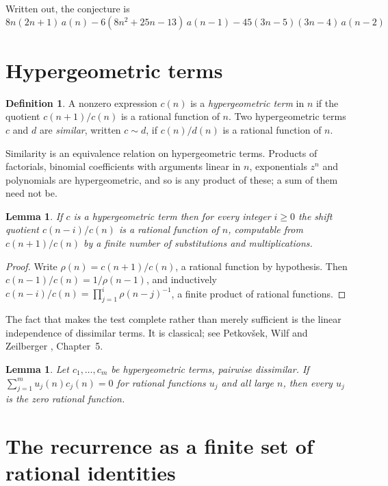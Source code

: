 \documentclass[11pt,a4paper]{article}
\theoremstyle{plain}
\newtheorem{lemma}[theorem]{Lemma}
\theoremstyle{definition}
\newtheorem{definition}[theorem]{Definition}
\begin{document}
Written out, the conjecture is
\begin{equation}\label{eq:conj}
8 n \left(2 n + 1\right)\,a(n) -  6 \left(8 n^{2} + 25 n - 13\right)\,a(n-1) -  45 \left(3 n - 5\right) \left(3 n - 4\right)\,a(n-2)
\end{equation}

\section{Hypergeometric terms}

\begin{definition}
A nonzero expression $c(n)$ is a \emph{hypergeometric term} in $n$ if the quotient
$c(n+1)/c(n)$ is a rational function of $n$. Two hypergeometric terms $c$ and $d$ are
\emph{similar}, written $c\sim d$, if $c(n)/d(n)$ is a rational function of $n$.
\end{definition}

Similarity is an equivalence relation on hypergeometric terms. Products of factorials,
binomial coefficients with arguments linear in $n$, exponentials $z^{n}$ and polynomials
are hypergeometric, and so is any product of these; a sum of them need not be.

\begin{lemma}\label{lem:shift}
If $c$ is a hypergeometric term then for every integer $i\ge 0$ the shift quotient
$c(n-i)/c(n)$ is a rational function of $n$, computable from $c(n+1)/c(n)$ by a finite
number of substitutions and multiplications.
\end{lemma}

\begin{proof}
Write $\rho(n)=c(n+1)/c(n)$, a rational function by hypothesis. Then
$c(n-1)/c(n)=1/\rho(n-1)$, and inductively
$c(n-i)/c(n)=\prod_{j=1}^{i}\rho(n-j)^{-1}$, a finite product of rational functions.
\end{proof}

The fact that makes the test complete rather than merely sufficient is the linear
independence of dissimilar terms. It is classical; see Petkov\v{s}ek, Wilf and Zeilberger
\cite{AB}, Chapter~5.

\begin{lemma}\label{lem:indep}
Let $c_{1},\dots,c_{m}$ be hypergeometric terms, pairwise dissimilar. If
$\sum_{j=1}^{m}u_{j}(n)c_{j}(n)=0$ for rational functions $u_{j}$ and all large $n$, then
every $u_{j}$ is the zero rational function.
\end{lemma}

\section{The recurrence as a finite set of rational identities}
\end{document}
